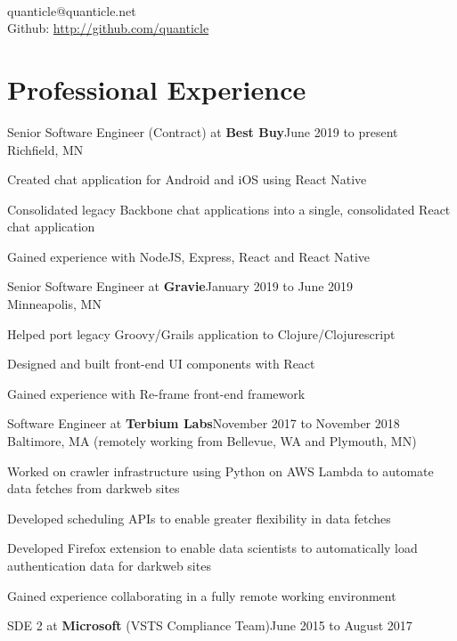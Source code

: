 \documentclass[letterpaper]{article}
\newenvironment{resume-list}
{\begin{itemize}
 \setlength{\itemsep}{0pt}
 \setlength{\parskip}{0pt}}
{\end{itemize}}
\begin{document}
\\
{\small quanticle@quanticle.net}\\
{\small Github: \url{http://github.com/quanticle}}\\
\section*{Professional Experience}
\noindent Senior Software Engineer (Contract) at {\bfseries Best Buy}\dotfill June 2019 to present\\
Richfield, MN
\begin{resume-list}
\item Created chat application for Android and iOS using React Native
\item Consolidated legacy Backbone chat applications into a single, consolidated React chat application
\item Gained experience with NodeJS, Express, React and React Native
\end{resume-list}
\noindent Senior Software Engineer at {\bfseries Gravie}\dotfill January 2019 to June 2019\\
Minneapolis, MN
\begin{resume-list}
\item Helped port legacy Groovy/Grails application to Clojure/Clojurescript
\item Designed and built front-end UI components with React
\item Gained experience with Re-frame front-end framework
\end{resume-list}
\noindent Software Engineer at {\bfseries Terbium Labs}\dotfill November 2017 to November 2018\\
Baltimore, MA (remotely working from Bellevue, WA and Plymouth, MN)
\begin{resume-list}
\item Worked on crawler infrastructure using Python on AWS Lambda to automate data fetches from darkweb sites
\item Developed scheduling APIs to enable greater flexibility in data fetches
\item Developed Firefox extension to enable data scientists to automatically load authentication data for darkweb sites
\item Gained experience collaborating in a fully remote working environment
\end{resume-list}
\noindent SDE 2 at {\bfseries Microsoft} (VSTS Compliance Team)\dotfill June 2015 to August 2017\\
\end{document}
